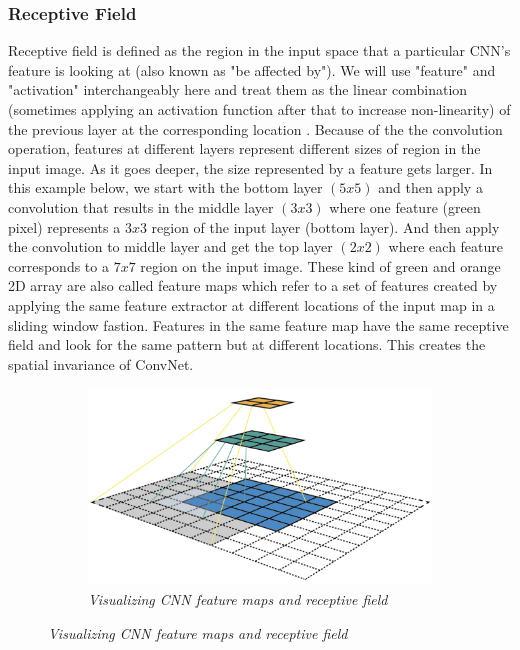 \subsubsection{Receptive Field}
Receptive field is defined as the region in the input space that a particular
CNN's feature is looking at (also known as "be affected by"). We will use
"feature" and "activation" interchangeably here and treat them as the linear
combination (sometimes applying an activation function after that to increase
non-linearity) of the previous layer at the corresponding location \cite{ssd_2}.
Because of the the convolution operation, features at different layers represent
different sizes of region in the input image. As it goes deeper, the size
represented by a feature gets larger. In this example below, we start with the
bottom layer $(5x5)$ and then apply a convolution that results in the middle layer
$(3x3)$ where one feature (green pixel) represents a $3x3$ region of the input
layer (bottom layer). And then apply the convolution to middle layer and get the
top layer $(2x2)$ where each feature corresponds to a $7x7$ region on the input
image. These kind of green and orange 2D array are also called feature maps
which refer to a set of features created by applying the same feature extractor
at different locations of the input map in a sliding window fastion. Features
in the same feature map have the same receptive field and look for the same
pattern but at different locations. This creates the spatial invariance of ConvNet.

\begin{figure}[H]
    \centering
    \begin{subfigure}[b]{0.8\textwidth}
        \centering
        \includegraphics[width=\textwidth]{Figures/2. Related Work/ssd_5.png}
        \caption{\textit{
                Visualizing CNN feature maps and receptive field
            } \cite{ssd_1}}
    \end{subfigure}
\end{figure}

